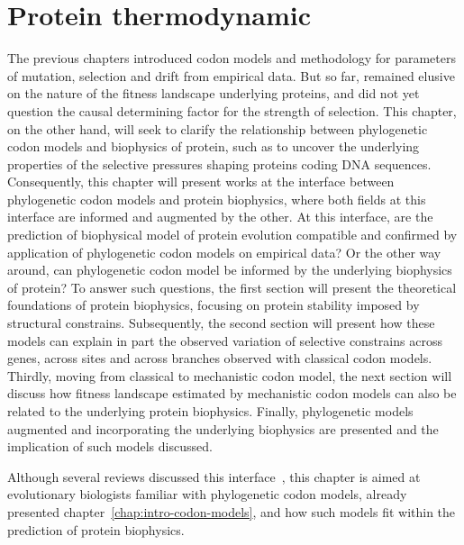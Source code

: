 \chapter{Protein thermodynamic}
{\hypersetup{linkcolor=GREYDARK}\minitoc}
\label{chap:intro-physic-proteins}

The previous chapters introduced codon models and methodology for parameters of mutation, selection and drift from empirical data. But so far, remained elusive on the nature of the fitness landscape underlying proteins, and did not yet question the causal determining factor for the strength of selection.
This chapter, on the other hand, will seek to clarify the relationship between phylogenetic codon models and biophysics of protein, such as to uncover the underlying properties of the selective pressures shaping proteins coding \acrshort{DNA} sequences.
Consequently, this chapter will present works at the interface between phylogenetic codon models and protein biophysics, where both fields at this interface are informed and augmented by the other. 
At this interface, are the prediction of biophysical model of protein evolution compatible and confirmed by application of phylogenetic codon models on empirical data?
Or the other way around, can phylogenetic codon model be informed by the underlying biophysics of protein?
To answer such questions, the first section will present the theoretical foundations of protein biophysics, focusing on protein stability imposed by structural constrains.
Subsequently, the second section will present how these models can explain in part the observed variation of selective constrains across genes, across sites and across branches observed with classical codon models.
Thirdly, moving from classical to mechanistic codon model, the next section will discuss how fitness landscape estimated by mechanistic codon models can also be related to the underlying protein biophysics.
Finally, phylogenetic models augmented and incorporating the underlying biophysics are presented and the implication of such models discussed.

Although several reviews discussed this interface~\citep{Liberles2012,Serohijos2014,Sikosek2014,Arenas2015,Echave2017,Bastolla2017}, this chapter is aimed at evolutionary biologists familiar with phylogenetic codon models, already presented chapter~\ref{chap:intro-codon-models}, and how such models fit within the prediction of protein biophysics.

